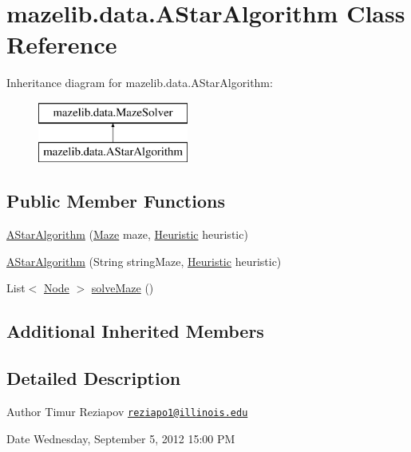 \hypertarget{classmazelib_1_1data_1_1_a_star_algorithm}{\section{mazelib.\-data.\-A\-Star\-Algorithm Class Reference}
\label{classmazelib_1_1data_1_1_a_star_algorithm}
}
Inheritance diagram for mazelib.\-data.\-A\-Star\-Algorithm\-:\begin{figure}[H]
\begin{center}
\leavevmode
\includegraphics[height=2.000000cm]{classmazelib_1_1data_1_1_a_star_algorithm}
\end{center}
\end{figure}
\subsection*{Public Member Functions}
\begin{DoxyCompactItemize}
\item 
\hyperlink{classmazelib_1_1data_1_1_a_star_algorithm_af14ad7c669df46dd8c866223305a1f02}{A\-Star\-Algorithm} (\hyperlink{classmazelib_1_1data_1_1_maze}{Maze} maze, \hyperlink{interfacemazelib_1_1data_1_1_heuristic}{Heuristic} heuristic)
\item 
\hyperlink{classmazelib_1_1data_1_1_a_star_algorithm_a391f71803973c0d1241c5232dadee49f}{A\-Star\-Algorithm} (String string\-Maze, \hyperlink{interfacemazelib_1_1data_1_1_heuristic}{Heuristic} heuristic)
\item 
List$<$ \hyperlink{classmazelib_1_1data_1_1_node}{Node} $>$ \hyperlink{classmazelib_1_1data_1_1_a_star_algorithm_aaa690f9111cf47f54a10c84c28cfcba4}{solve\-Maze} ()
\end{DoxyCompactItemize}
\subsection*{Additional Inherited Members}


\subsection{Detailed Description}
\begin{DoxyAuthor}{Author}
Timur Reziapov \href{mailto:reziapo1@illinois.edu}{\tt reziapo1@illinois.\-edu} 
\end{DoxyAuthor}
\begin{DoxyDate}{Date}
Wednesday, September 5, 2012 15\-:00 P\-M 
\end{DoxyDate}



